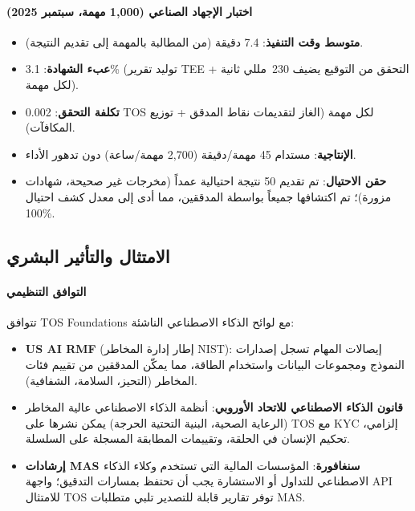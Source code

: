 \documentclass[11pt]{article}
\begin{document}
\paragraph{اختبار الإجهاد الصناعي (1,000 مهمة، سبتمبر 2025)}
\begin{itemize}[noitemsep]
  \item \textbf{متوسط وقت التنفيذ}: 7.4 دقيقة (من المطالبة بالمهمة إلى تقديم النتيجة).
  \item \textbf{عبء الشهادة}: 3.1\% (توليد تقرير TEE + التحقق من التوقيع يضيف 230~مللي ثانية لكل مهمة).
  \item \textbf{تكلفة التحقق}: 0.002 TOS لكل مهمة (الغاز لتقديمات نقاط المدقق + توزيع المكافآت).
  \item \textbf{الإنتاجية}: مستدام 45 مهمة/دقيقة (2,700 مهمة/ساعة) دون تدهور الأداء.
  \item \textbf{حقن الاحتيال}: تم تقديم 50 نتيجة احتيالية عمداً (مخرجات غير صحيحة، شهادات مزورة)؛ تم اكتشافها جميعاً بواسطة المدققين، مما أدى إلى معدل كشف احتيال 100\%.
\end{itemize}

\subsection{الامتثال والتأثير البشري}
\paragraph{التوافق التنظيمي} تتوافق TOS Foundations مع لوائح الذكاء الاصطناعي الناشئة:
\begin{itemize}[noitemsep]
  \item \textbf{US AI RMF} (إطار إدارة المخاطر NIST): إيصالات المهام تسجل إصدارات النموذج ومجموعات البيانات واستخدام الطاقة، مما يمكّن المدققين من تقييم فئات المخاطر (التحيز، السلامة، الشفافية).
  \item \textbf{قانون الذكاء الاصطناعي للاتحاد الأوروبي}: أنظمة الذكاء الاصطناعي عالية المخاطر (الرعاية الصحية، البنية التحتية الحرجة) يمكن نشرها على TOS مع KYC إلزامي، تحكيم الإنسان في الحلقة، وتقييمات المطابقة المسجلة على السلسلة.
  \item \textbf{إرشادات MAS سنغافورة}: المؤسسات المالية التي تستخدم وكلاء الذكاء الاصطناعي للتداول أو الاستشارة يجب أن تحتفظ بمسارات التدقيق؛ واجهة API للامتثال TOS توفر تقارير قابلة للتصدير تلبي متطلبات MAS.
\end{itemize}
\end{document}
